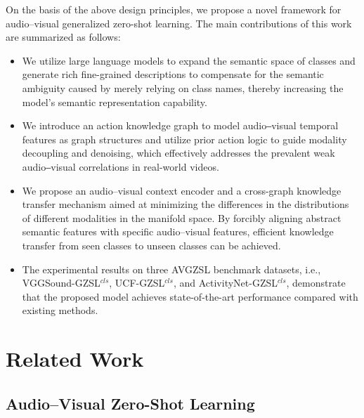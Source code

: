 \documentclass[lettersize,journal]{IEEEtran}
\begin{document}
On the basis of the above design principles, we propose a novel framework for audio–visual generalized zero-shot learning. The main contributions of this work are summarized as follows:

\begin{itemize}
\item{We utilize large language models to expand the semantic space of classes and generate rich fine-grained descriptions to compensate for the semantic ambiguity caused by merely relying on class names, thereby increasing the model's semantic representation capability.}
\item{We introduce an action knowledge graph to model audio‒visual temporal features as graph structures and utilize prior action logic to guide modality decoupling and denoising, which effectively addresses the prevalent weak audio‒visual correlations in real-world videos.}
\item{We propose an audio–visual context encoder and a cross-graph knowledge transfer mechanism aimed at minimizing the differences in the distributions of different modalities in the manifold space. By forcibly aligning abstract semantic features with specific audio–visual features, efficient knowledge transfer from seen classes to unseen classes can be achieved.}
\item{The experimental results on three AVGZSL benchmark datasets, i.e., VGGSound-GZSL$^{\textit{cls}}$, UCF-GZSL$^{\textit{cls}}$, and ActivityNet-GZSL$^{\textit{cls}}$, demonstrate that the proposed model achieves state-of-the-art performance compared with existing methods.}
\end{itemize}


\section{Related Work}
\subsection{Audio–Visual Zero-Shot Learning}
\end{document}
